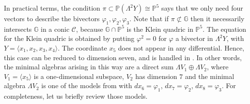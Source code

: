 \documentclass[10pt,reqno]{amsart}
\newcommand{\la}{\langle}
\newcommand{\ra}{\rangle}
\newcommand{\GG}{\mathbb{G}}
\newcommand{\PP}{\mathbb P}
\newcommand{\f}{\varphi}
\renewcommand{\L}{\Lambda}
\theoremstyle{definition}
\begin{document}
\noindent In practical terms, the condition $\pi \subset \PP(\L^2 Y)\cong\PP^5$ says that we only need four vectors to describe the bivectors $\f_1, \f_2, \f_3$. Note that if $\pi \not \subset \GG$ then it necessarily intersects $\GG$ in a conic $\mathscr{C}$, because $\GG\cap\PP^5$ is the Klein quadric in $\PP^5$. The equation for the Klein quadric is obtained by putting $\f^2=0$ for $\f$ a bivector in $\L^2 Y$, with $Y=\la x_1,x_2,x_3,x_4 \ra$. The coordinate $x_5$ does not appear in any differential.
Hence, this case can be reduced to dimension seven, and is handled in \cite{B}. In other words, the minimal algebras arising in this way are a direct sum $\L  V_1  \oplus \L V_2$, where $V_1=\la x_5 \ra$ is a one-dimensional subspace, $V_2$ has dimension $7$ and the minimal algebra $\L V_2$ is one of the models from \cite{B} with $dx_6=\f_1$, $dx_7=\f_2$, $dx_8=\f_3$.
For completeness, let us briefly review those models.
\end{document}
